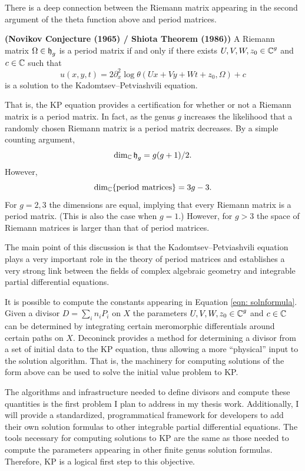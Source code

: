 There is a deep connection between the Riemann matrix appearing in the
second argument of the theta function above and period matrices.
\begin{theorem}
  {\bf (Novikov Conjecture (1965) / Shiota Theorem (1986))}
  \cite{Shiota86} A Riemann matrix $\Omega \in \operatorname{\mathfrak{h}}_g$ is a period matrix
  if and only if there exists $U,V,W,z_0 \in \operatorname{\mathbb{C}}^g$ and $c \in \operatorname{\mathbb{C}}$ such
  that
  \[
      u(x,y,t)
      =
      2 \partial_x^2 \log \theta(Ux + Vy + Wt + z_0, \Omega) + c
  \]
  is a solution to the Kadomtsev--Petviashvili equation.
\end{theorem}
That is, the KP equation provides a certification for whether or not a
Riemann matrix is a period matrix. In fact, as the genus $g$ increases
the likelihood that a randomly chosen Riemann matrix is a period matrix
decreases. By a simple counting argument,
\[
    \dim_{\operatorname{\mathbb{C}}} \operatorname{\mathfrak{h}}_g = g(g+1)/2.
\]
However,
\[
    \dim_{\operatorname{\mathbb{C}}} \{ \text{period matrices} \} = 3g-3.
\]
For $g=2,3$ the dimensions are equal, implying that every Riemann matrix
is a period matrix. (This is also the case when $g=1$.)  However, for $g
> 3$ the space of Riemann matrices is larger than that of period
matrices.

The main point of this discussion is that the Kadomtsev--Petviashvili
equation plays a very important role in the theory of period matrices
and establishes a very strong link between the fields of complex
algebraic geometry and integrable partial differential equations.

It is possible to compute the constants appearing in Equation
\eqref{eqn: solnformula}. Given a divisor $D = \sum_i n_i P_i$ on $X$
the parameters $U,V,W,z_0 \in \operatorname{\mathbb{C}}^g$ and $c \in \operatorname{\mathbb{C}}$ can be determined
by integrating certain meromorphic differentials around certain paths on
$X$. Deconinck \cite{DS98} provides a method for determining a divisor
from a set of initial data to the KP equation, thus allowing a more
``physical'' input to the solution algorithm. That is, the machinery for
computing solutions of the form above can be used to solve the initial
value problem to KP.

The algorithms and infrastructure needed to define divisors and compute
these quantities is the first problem I plan to address in my thesis
work. Additionally, I will provide a standardized, programmatical
framework for developers to add their own solution formulas to other
integrable partial differential equations. The tools necessary for
computing solutions to KP are the same as those needed to compute the
parameters appearing in other finite genus solution formulas. Therefore,
KP is a logical first step to this objective.

